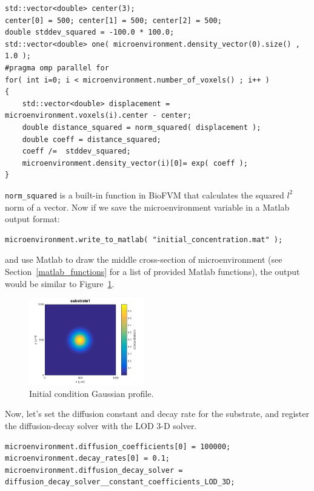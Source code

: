\documentclass[11pt]{article}
\begin{document}
\begin{verbatim}
std::vector<double> center(3);
center[0] = 500; center[1] = 500; center[2] = 500;
double stddev_squared = -100.0 * 100.0; 	
std::vector<double> one( microenvironment.density_vector(0).size() , 1.0 );
#pragma omp parallel for
for( int i=0; i < microenvironment.number_of_voxels() ; i++ )
{
    std::vector<double> displacement = microenvironment.voxels(i).center - center;
    double distance_squared = norm_squared( displacement );
    double coeff = distance_squared;
    coeff /=  stddev_squared;
    microenvironment.density_vector(i)[0]= exp( coeff );
}
\end{verbatim}

\verb:norm_squared: is a built-in function in BioFVM that calculates the squared $l^2$ norm of a vector. Now if we save the microenvironment variable in a Matlab output format:
\begin{verbatim}
microenvironment.write_to_matlab( "initial_concentration.mat" );
\end{verbatim}

\noindent and use Matlab to draw the middle cross-section of microenvironment (see Section~\ref{matlab_functions} for a list of provided Matlab functions), the output would be similar to Figure~\ref{./figures/tutorial1_fig}.

\begin{figure}[h]
\centering
\includegraphics[width=0.45\textwidth]{./figures/tutorial1_fig1.png}
\caption{Initial condition Gaussian profile.}
\label{./figures/tutorial1_fig}
\end{figure}

Now, let's set the diffusion constant and decay rate for the substrate, and register the diffusion-decay solver with the LOD 3-D solver.
\begin{verbatim}
microenvironment.diffusion_coefficients[0] = 100000;
microenvironment.decay_rates[0] = 0.1;
microenvironment.diffusion_decay_solver = diffusion_decay_solver__constant_coefficients_LOD_3D;
\end{verbatim}
\end{document}
